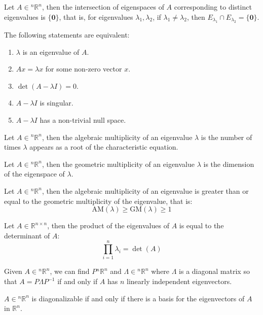 \documentclass[11pt]{article}
\begin{document}
\begin{theorem}
    Let $A \in {^n\mathbb{R}^n}$, then the intersection of eigenspaces of $A$ corresponding to distinct eigenvalues is $\{\textbf{0}\}$, that is, for eigenvalues $\lambda_1, \lambda_2$, if $\lambda_1 \neq \lambda_2$, then $E_{\lambda_1} \cap E_{\lambda_2} = \{\textbf{0}\}$.
\end{theorem}
\begin{theorem}
    The following statements are equivalent:
    \begin{enumerate}
        \item $\lambda$ is an eigenvalue of $A$.
        \item $Ax = \lambda x$ for some non-zero vector $x$.
        \item $\det(A - \lambda I) = 0$.
        \item $A - \lambda I$ is singular.
        \item $A - \lambda I$ has a non-trivial null space.
    \end{enumerate}
    
\end{theorem}
\begin{definition}
    Let $A \in {^n\mathbb{R}^n}$, then the algebraic multiplicity of an eigenvalue $\lambda$ is the number of times $\lambda$ appears as a root of the characteristic equation.
\end{definition}
\begin{definition}
    Let $A \in {^n\mathbb{R}^n}$, then the geometric multiplicity of an eigenvalue $\lambda$ is the dimension of the eigenspace of $\lambda$.
\end{definition}
\begin{theorem}
    Let $A \in {^n\mathbb{R}^n}$, then the algebraic multiplicity of an eigenvalue is greater than or equal to the geometric multiplicity of the eigenvalue, that is:
    \begin{equation}
        \text{AM}(\lambda) \ge \text{GM}(\lambda) \ge 1
    \end{equation}
\end{theorem}
\begin{theorem}
    Let $A \in \mathbb{R}^{n \times n}$, then the product of the eigenvalues of $A$ is equal to the determinant of $A$:
    \begin{equation}
        \prod_{i=1}^{n} \lambda_i = \det(A)
    \end{equation}
\end{theorem}
\begin{theorem}
    Given $A\in {^n\mathbb{R}^n}$, we can find $P {^n\mathbb{R}^n}$ and $\Lambda \in {^n\mathbb{R}^n}$ where $\Lambda$ is a diagonal matrix so that $A = P\Lambda P^{-1}$ if and only if $A$ has $n$ linearly independent eigenvectors.
\end{theorem}
\begin{theorem}
    $A \in {^n\mathbb{R}^n}$ is diagonalizable if and only if there is a basis for the eigenvectors of $A$ in $\mathbb{R}^n$.
\end{theorem}
\end{document}
